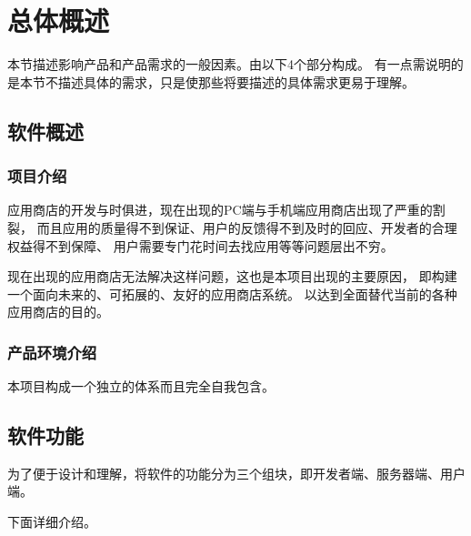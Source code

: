 \chapter{总体概述}

本节描述影响产品和产品需求的一般因素。由以下4个部分构成。 有一点需说明的是本节不描述具体的需求，只是使那些将要描述的具体需求更易于理解。
\section{软件概述}
\subsection{项目介绍}
应用商店的开发与时俱进，现在出现的PC端与手机端应用商店出现了严重的割裂，
而且应用的质量得不到保证、用户的反馈得不到及时的回应、开发者的合理权益得不到保障、
用户需要专门花时间去找应用等等问题层出不穷。

现在出现的应用商店无法解决这样问题，这也是本项目出现的主要原因，
即构建一个面向未来的、可拓展的、友好的应用商店系统。
以达到全面替代当前的各种应用商店的目的。


\subsection{产品环境介绍}

本项目构成一个独立的体系而且完全自我包含。

\section{软件功能}
为了便于设计和理解，将软件的功能分为三个组块，即开发者端、服务器端、用户端。


下面详细介绍。

